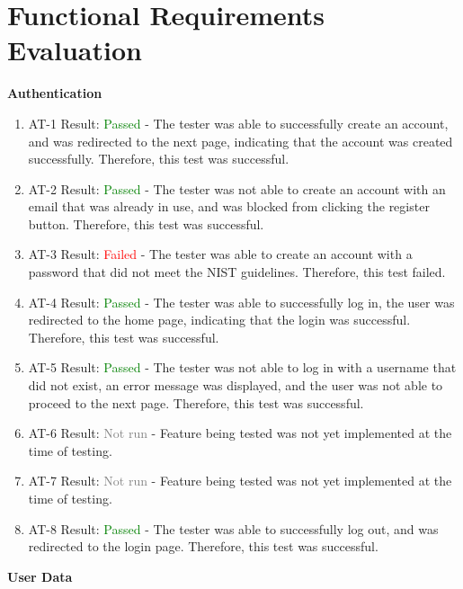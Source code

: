 \documentclass[12pt, titlepage]{article}
\begin{document}
\newpage


\section{Functional Requirements Evaluation}

\noindent\large{\textbf{Authentication}}

\normalsize

\begin{enumerate}
  \item AT-1
  Result: \textcolor{green}{Passed} - The tester was able to successfully create an account, and was redirected to the next page, 
  indicating that the account was created successfully. Therefore, this test was successful.
  \item AT-2
  Result: \textcolor{green}{Passed} - The tester was not able to create an account with an email that was already in use, 
  and was blocked from clicking the register button. Therefore, this test was successful.
  \item AT-3
  Result: \textcolor{red}{Failed} - The tester was able to create an account with a password that did not meet the NIST guidelines. 
  Therefore, this test failed.
  \item AT-4
  Result: \textcolor{green}{Passed} - The tester was able to successfully log in, the user was redirected to the home page, 
  indicating that the login was successful. Therefore, this test was successful.
  \item AT-5
  Result: \textcolor{green}{Passed} - The tester was not able to log in with a username that did not exist, an error message was displayed,
  and the user was not able to proceed to the next page. Therefore, this test was successful.
  \item AT-6
  Result: \textcolor{gray}{Not run} - Feature being tested was not yet implemented at the time of testing.
  \item AT-7
  Result: \textcolor{gray}{Not run} - Feature being tested was not yet implemented at the time of testing.
  \item AT-8
  Result: \textcolor{green}{Passed} - The tester was able to successfully log out, and was redirected to the login page. 
  Therefore, this test was successful.
\end{enumerate}

\noindent\large{\textbf{User Data}}

\normalsize
\end{document}
